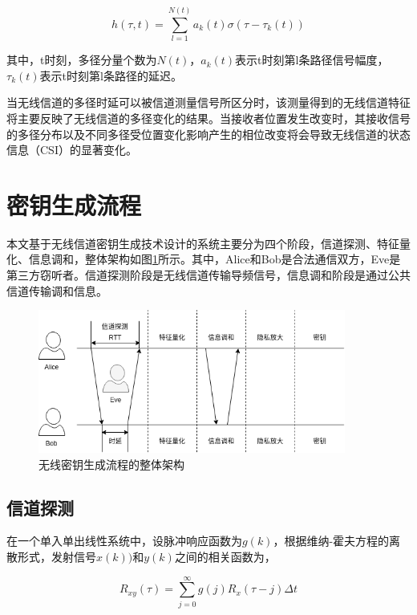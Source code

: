 \documentclass[master]{seuthesis} %
\begin{document}
\begin{Main}
\begin{equation}
    h(\tau, t) = \sum_{l = 1}^{N(t)} a_k(t) \sigma(\tau - \tau_k(t))
\end{equation}

其中，t时刻，多径分量个数为$N(t)$，$a_k(t)$表示t时刻第l条路径信号幅度，$\tau_k(t)$表示t时刻第l条路径的延迟。

当无线信道的多径时延可以被信道测量信号所区分时，该测量得到的无线信道特征将主要反映了无线信道的多径变化的结果。当接收者位置发生改变时，其接收信号的多径分布以及不同多径受位置变化影响产生的相位改变将会导致无线信道的状态信息（CSI）的显著变化。


\section{密钥生成流程}

本文基于无线信道密钥生成技术设计的系统主要分为四个阶段，信道探测、特征量化、信息调和，整体架构如图\ref{whole_structure}所示。其中，Alice和Bob是合法通信双方，Eve是第三方窃听者。信道探测阶段是无线信道传输导频信号，信息调和阶段是通过公共信道传输调和信息。

\begin{figure}[htbp!]
    \centering \includegraphics[width=0.9\textwidth]{images/whole_structure} 
    \caption{无线密钥生成流程的整体架构}
    \label{whole_structure}
\end{figure}

\subsection{信道探测}

在一个单入单出线性系统中，设脉冲响应函数为$g(k)$，根据维纳-霍夫方程的离散形式，发射信号$x(k))$和$y(k)$之间的相关函数为，

\begin{equation}
    R_{xy}(\tau)  = \sum_{j=0}^{\infty} g(j) R_x(\tau-j)\Delta t
\end{equation}


\end{Main}
\end{document}
